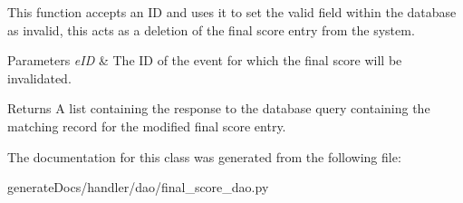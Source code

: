 This function accepts an ID and uses it to set the valid field within the database as invalid, this acts as a deletion of the final score entry from the system.


\begin{DoxyParams}{Parameters}
{\em e\+ID} & The ID of the event for which the final score will be invalidated.\\
\hline
\end{DoxyParams}
\begin{DoxyReturn}{Returns}
A list containing the response to the database query containing the matching record for the modified final score entry. 
\end{DoxyReturn}


The documentation for this class was generated from the following file\+:\begin{DoxyCompactItemize}
\item 
generate\+Docs/handler/dao/final\+\_\+score\+\_\+dao.\+py\end{DoxyCompactItemize}
